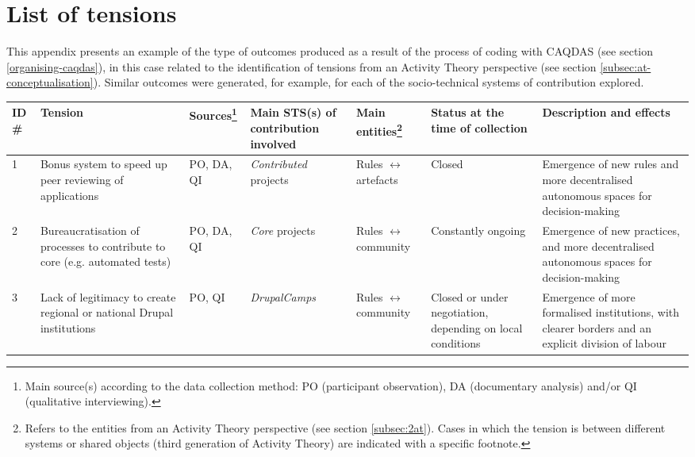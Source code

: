 \chapter{List of tensions}
\label{appendix-list-conflicts}

This appendix presents an example of the type of outcomes produced as a result of the process of coding with CAQDAS (see section \ref{organising-caqdas}), in this case related to the identification of tensions from an Activity Theory perspective (see section \ref{subsec:at-conceptualisation}). Similar outcomes were generated, for example, for each of the socio-technical systems of contribution explored.

\begin{scriptsize}
\begin{longtable}{|p{0.35cm}||p{2.5cm}|p{1.1cm}|p{2cm}|p{1.8cm}|p{1.4cm}|p{3.4cm}|}
\hline
ID \# & 
Tension &
Sources\footnote{Main source(s) according to the data collection method: PO (participant observation), DA (documentary analysis) and/or QI (qualitative interviewing).} & 
Main STS(s) of contribution involved & 
Main entities\footnote{Refers to the entities from an Activity Theory perspective (see section \ref{subsec:2at}). Cases in which the tension is between different systems or shared objects (third generation of Activity Theory) are indicated with a specific footnote.} & 
Status at the time of collection & 
Description and effects 
\\ \hline \hline

1  & Bonus system to speed up peer reviewing of applications  & PO, DA, QI & \textit{Contributed} projects & Rules $ \leftrightarrow $ artefacts & Closed  & Emergence of new rules and more decentralised autonomous spaces for decision-making  \\ \hline


2  & Bureaucratisation of processes to contribute to core (e.g. automated tests) & PO, DA, QI & \textit{Core} projects & Rules $ \leftrightarrow $ community & Constantly ongoing & Emergence of new practices, and more decentralised autonomous spaces for decision-making \\ \hline


3  & Lack of legitimacy to create regional or national Drupal institutions  & PO, QI & \textit{DrupalCamps} & Rules $ \leftrightarrow $ community & Closed or under negotiation, depending on local conditions & Emergence of more formalised institutions, with clearer borders and an explicit division of labour \\ \hline



\end{longtable}
\end{scriptsize}
